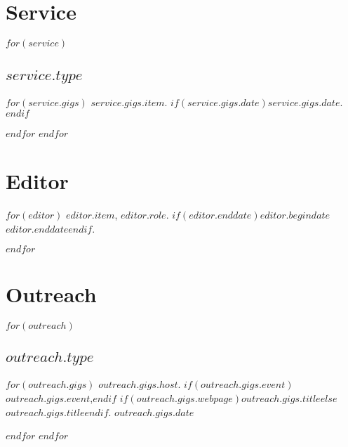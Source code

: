 \documentclass[11pt]{article}
\def\printdate#1{\xprintdate#1-}
\def\xprintdate#1-#2-#3-{#1}
\def\daterange#1#2{\xprintdate#1---\xprintdate#2-}
\begin{document}
\begin{publications}
\end{publications}

\section{Service}

$for(service)$
\subsection{$service.type$}
$for(service.gigs)$
\ind $service.gigs.item$. $if(service.gigs.date)$$service.gigs.date$.$endif$

$endfor$
$endfor$

\section{Editor}

$for(editor)$
\ind \textit{\href{$editor.link$}{$editor.item$}}, $editor.role$. $if(editor.enddate)$\daterange{$editor.begindate$}{$editor.enddate$}$else$\printdate{$editor.begindate$}--$endif$.

$endfor$

\section{Outreach}

$for(outreach)$
\subsection{$outreach.type$}
$for(outreach.gigs)$
\ind $outreach.gigs.host$. $if(outreach.gigs.event)$$outreach.gigs.event$,$endif$ $if(outreach.gigs.webpage)$\href{$outreach.gigs.webpage$}{$outreach.gigs.title$}$else$$outreach.gigs.title$$endif$. $outreach.gigs.date$

$endfor$
$endfor$
\end{document}

